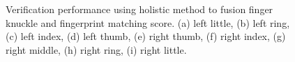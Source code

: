 \begin{figure}[ht!]
    \caption{Verification performance using holistic method to fusion finger knuckle and fingerprint matching score. (a) left little, (b) left ring, (c) left index, (d) left thumb, (e) right thumb, (f) right index, (g) right middle, (h) right ring, (i) right little.}
    \label{fusion-score}
\end{figure}